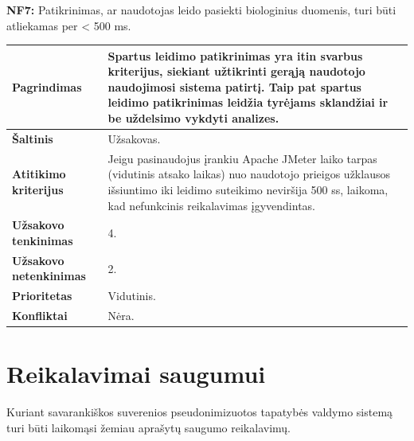 \documentclass[12pt]{article}
\begin{document}
\noindent \textbf{NF7:} Patikrinimas, ar naudotojas leido pasiekti biologinius
duomenis, turi būti atliekamas per < 500 ms.
\label{sec:NF7}
\begin{table}[htb!]
    \captionsetup{justification=centering}
    \vskip -10pt
    \begin{tabular}{|m{4.9cm}|m{11cm}|}
        \hline
        \raggedleft \textbf{\cellcolor{deepchampagne}Pagrindimas} &
        Spartus leidimo patikrinimas yra itin svarbus kriterijus, siekiant
        užtikrinti gerąją naudotojo naudojimosi sistema patirtį. Taip pat
        spartus leidimo patikrinimas leidžia tyrėjams sklandžiai ir be uždelsimo
        vykdyti analizes. \\
        \hline
        \raggedleft \textbf{\cellcolor{deepchampagne}Šaltinis} & Užsakovas. \\
        \hline
        \raggedleft \textbf{\cellcolor{deepchampagne}Atitikimo kriterijus} & 
        Jeigu pasinaudojus įrankiu Apache JMeter laiko tarpas (vidutinis atsako
        laikas) nuo naudotojo prieigos užklausos išsiuntimo iki leidimo
        suteikimo neviršija 500 ss, laikoma, kad nefunkcinis reikalavimas
        įgyvendintas. \\
        \hline
        \raggedleft \textbf{\cellcolor{deepchampagne}Užsakovo tenkinimas} & 4. \\
        \hline
        \raggedleft \textbf{\cellcolor{deepchampagne}Užsakovo netenkinimas} & 2. \\
        \hline
        \raggedleft \textbf{\cellcolor{deepchampagne}Prioritetas} & Vidutinis. \\
        \hline
        \raggedleft \textbf{\cellcolor{deepchampagne}Konfliktai} & Nėra. \\
        \hline
    \end{tabular}
\end{table}

\newpage

\section{Reikalavimai saugumui}
Kuriant savarankiškos suverenios pseudonimizuotos tapatybės valdymo sistemą
turi būti laikomąsi žemiau aprašytų saugumo reikalavimų.
\vskip 10pt
\end{document}
